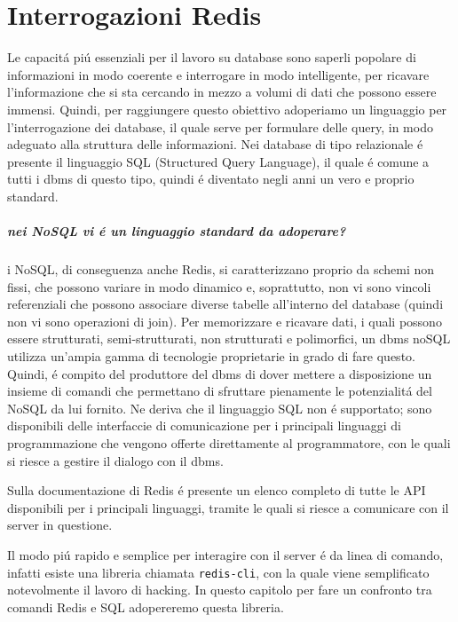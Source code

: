 \chapter{Interrogazioni Redis}
Le capacitá piú essenziali per il lavoro su database sono saperli popolare di informazioni in modo coerente e interrogare in modo
intelligente, per ricavare l'informazione che si sta cercando in mezzo a volumi di dati che possono essere immensi.
Quindi, per raggiungere questo obiettivo adoperiamo un linguaggio per l'interrogazione dei database, il quale serve per formulare delle
query, in modo adeguato alla struttura delle informazioni.
Nei database di tipo relazionale é presente il linguaggio SQL (Structured Query Language), il quale é comune a tutti i dbms di questo tipo, quindi
é diventato negli anni un vero e proprio standard.

\paragraph{nei NoSQL vi é un linguaggio standard da adoperare?\\}
i NoSQL, di conseguenza anche Redis, si caratterizzano proprio da schemi non fissi, che possono variare in modo dinamico e, soprattutto, non vi sono vincoli referenziali che possono associare
diverse tabelle all'interno del database (quindi non vi sono operazioni di join).
Per memorizzare e ricavare dati, i quali possono essere strutturati, semi-strutturati, non strutturati e polimorfici, un dbms noSQL utilizza un'ampia gamma di
tecnologie proprietarie in grado di fare questo. Quindi, é compito del produttore del dbms di dover mettere a disposizione un insieme di comandi che permettano di sfruttare pienamente le potenzialitá del NoSQL da lui fornito.
Ne deriva che il linguaggio SQL non é supportato; sono disponibili delle interfaccie di comunicazione per i principali linguaggi di programmazione che vengono
offerte direttamente al programmatore, con le quali si riesce a gestire il dialogo con il dbms.

Sulla documentazione di Redis é presente un elenco completo di tutte le API disponibili per i principali linguaggi, tramite le quali si riesce a comunicare con il server in questione.

Il modo piú rapido e semplice per interagire con il server é da linea di comando, infatti esiste una libreria chiamata
\texttt{redis-cli}, con la quale viene semplificato notevolmente il lavoro di hacking.
In questo capitolo per fare un confronto tra comandi Redis e SQL adopereremo questa libreria.\\

